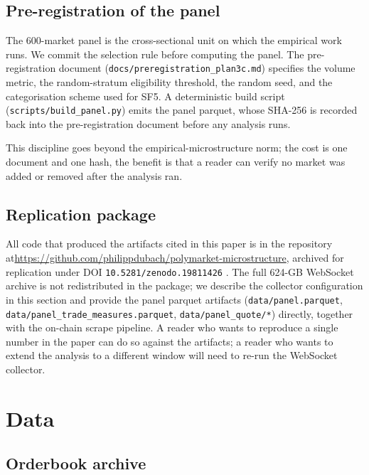 \documentclass[11pt,a4paper,twocolumn]{article}
\begin{document}
\subsection{Pre-registration of the panel}

The 600-market panel is the cross-sectional unit on which the
empirical work runs. We commit the selection rule before computing
the panel. The pre-registration document
(\texttt{docs/preregistration\_plan3c.md}) specifies the volume
metric, the random-stratum eligibility threshold, the random seed,
and the categorisation scheme used for SF5. A deterministic build
script (\texttt{scripts/build\_panel.py}) emits the panel parquet,
whose SHA-256 is recorded back into the pre-registration document
before any analysis runs.

This discipline goes beyond the empirical-microstructure norm; the
cost is one document and one hash, the benefit is that a reader can
verify no market was added or removed after the analysis ran.

\subsection{Replication package}

All code that produced the artifacts cited in this paper is in the
repository at\linebreak[1]
\url{https://github.com/philippdubach/polymarket-microstructure},
archived for replication under DOI
\texttt{10.5281/zenodo.19811426}
\citep{dubach-2026-replication}. The full 624-GB WebSocket archive
is not redistributed in the package; we describe the collector
configuration in this section and provide the panel parquet
artifacts
(\texttt{data/\allowbreak panel.parquet},
\texttt{data/\allowbreak panel\_trade\_measures.\allowbreak parquet},
\texttt{data/\allowbreak panel\_quote/*})
directly, together with the on-chain
scrape pipeline. A reader who wants to reproduce a single number in
the paper can do so against the artifacts; a reader who wants to
extend the analysis to a different window will need to re-run the
WebSocket collector.
\section{Data}\label{sec:data}

\subsection{Orderbook archive}
\label{ssec:orderbook-archive}
\end{document}
